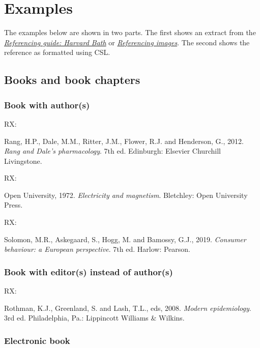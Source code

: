 \frenchspacing

\section{Examples}

The examples below are shown in two parts.
The first shows an extract from the
\href{https://library.bath.ac.uk/referencing/harvard-bath}{\emph{Referencing guide: Harvard Bath}} or
\href{https://library.bath.ac.uk/images/referencing}{\emph{Referencing images}}.
The second shows the reference as formatted using CSL.

\subsection{Books and book chapters}

\subsubsection*{Book with author(s)}

RX: \cite{rang.etal2012rdp}

Rang, H.P., Dale, M.M., Ritter, J.M., Flower, R.J. and Henderson, G., 2012. \emph{Rang and Dale's pharmacology}. 7th ed. Edinburgh: Elsevier Churchill Livingstone.


RX: \cite{ou1972em}

Open University, 1972. \emph{Electricity and magnetism}. Bletchley: Open University Press.


RX: \cite{solomon.etal2019cbe}

Solomon, M.R., Askegaard, S., Hogg, M. and Bamossy, G.J., 2019. \emph{Consumer behaviour: a European perspective}. 7th ed. Harlow: Pearson.



\subsubsection*{Book with editor(s) instead of author(s)}

RX: \cite{rothman.etal2008me}

Rothman, K.J., Greenland, S. and Lash, T.L., eds, 2008. \emph{Modern epidemiology}. 3rd ed. Philadelphia, Pa.: Lippincott Williams \& Wilkins.



\subsubsection*{Electronic book}

